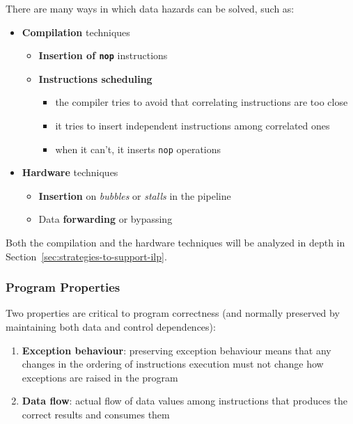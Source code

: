 \documentclass[english]{article}
\begin{document}
There are many ways in which data hazards can be solved, such as:

\begin{itemize}
  \item \textbf{Compilation} techniques
        \begin{itemize}
          \item \textbf{Insertion of \texttt{nop}} instructions
          \item \textbf{Instructions scheduling}
                \begin{itemize}
                  \item the compiler tries to avoid that correlating instructions are too close
                  \item it tries to insert independent instructions among correlated ones
                  \item when it can't, it inserts \texttt{nop} operations
                \end{itemize}
        \end{itemize}
  \item \textbf{Hardware} techniques
        \begin{itemize}
          \item \textbf{Insertion} on \textit{bubbles} or \textit{stalls} in the pipeline
          \item Data \textbf{forwarding} or bypassing
        \end{itemize}
\end{itemize}

Both the compilation and the hardware techniques will be analyzed in depth in Section~\ref{sec:strategies-to-support-ilp}.

\newpage

\subsubsection{Program Properties}

Two properties are critical to program correctness (and normally preserved by maintaining both data and control dependences):

\begin{enumerate}
  \item \textbf{Exception behaviour}: preserving exception behaviour means that any changes in the ordering of instructions execution must not change how exceptions are raised in the program
  \item \textbf{Data flow}: actual flow of data values among instructions that produces the correct results and consumes them
\end{enumerate}
\end{document}
